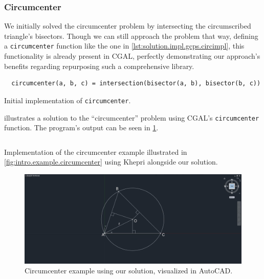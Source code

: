 \subsubsection*{Circumcenter}%
\label{sec:solution.impl.gcps.circumcenter}

We initially solved the circumcenter problem by intersecting the circumscribed
triangle's bisectors.  Though we can still approach the problem that way,
defining a \texttt{circumcenter} function like the one in
\cref{lst:solution.impl.gcps.circimpl}, this functionality is already present in
\ac{CGAL},  perfectly demonstrating our approach's benefits regarding
repurposing such a comprehensive library.

\begin{listing}[htbp]
  \begin{verbatim}
  circumcenter(a, b, c) = intersection(bisector(a, b), bisector(b, c)) 
  \end{verbatim}
  \caption[Initial circumcenter solution]{
    Initial implementation of \texttt{circumcenter}.}%
  \label{lst:solution.impl.gcps.circimpl}
\end{listing}

 illustrates a solution to the
``circumcenter'' problem using \ac{CGAL}'s \texttt{circumcenter} function.  The
program's output can be seen in \cref{fig:solution.impl.gcps.circumcenter}.

\begin{listing}[htbp]
  \inputminted{julia}{jl/ex_circumcenter.jl}
  \caption{\label{lst:solution.impl.gcps.circumcenter}
    Implementation of the circumcenter example illustrated in
    \cref{fig:intro.example.circumcenter} using Khepri alongside our solution.}%
\end{listing}

\begin{figure}[htbp]
  \includegraphics[width=\linewidth]{fig/autocad-circumcenter} 
  \caption{\label{fig:solution.impl.gcps.circumcenter}
    Circumcenter example using our solution, visualized in AutoCAD\@.}%
\end{figure}
